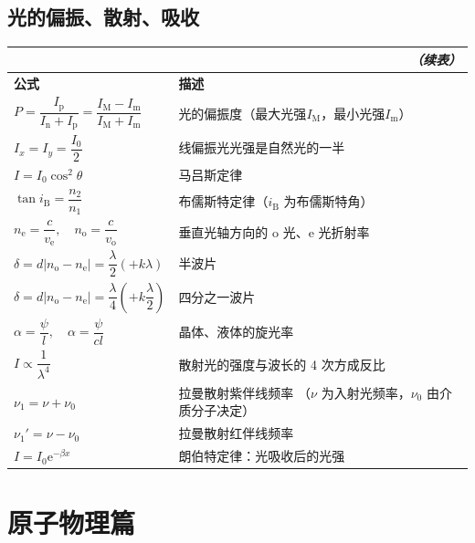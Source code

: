 \documentclass[UTF8]{ctexart}
\newcommand\Emph[1]{\colorbox{green!10}{\textcolor{green!30!black}{#1}}}
\newcommand\Example[1]{\textcolor{cyan!70!black}{\small #1}}
\begin{document}
\subsection{光的偏振、散射、吸收}
\begin{longtable}{|p{}|p{}|}
    \multicolumn{2}{r}{\textit{（续表）}} \\
    \hline
\endhead
    \hline
\endfirsthead
\endfoot
    \hline
\endlastfoot

    \textbf{公式} & \textbf{描述} \\
    \hline
    $P = \dfrac{I_{\mathrm{p}}}{I_{\mathrm{n}}+I_{\mathrm{p}}} = \dfrac{I_{\mathrm{M}}-I_{\mathrm{m}}}{I_{\mathrm{M}}+I_{\mathrm{m}}}$ & 光的偏振度\Example{（最大光强$I_{\mathrm{M}}$，最小光强$I_{\mathrm{m}}$）} \\
    \hline
    $I_x = I_y = \dfrac{I_0}{2}$ & 线偏振光光强是自然光的一半 \\
    \hline
    \Emph{$I = I_0\cos^2\theta$} & 马吕斯定律 \\
    \hline
    \Emph{$\tan i_{\mathrm{B}} = \dfrac{n_2}{n_1}$} & 布儒斯特定律\Example{（$i_{\mathrm{B}}$ 为布儒斯特角）} \\
    \hline
    $n_{\mathrm{e}} = \dfrac{c}{v_{\mathrm{e}}},\quad n_{\mathrm{o}} = \dfrac{c}{v_{\mathrm{o}}}$ & 垂直光轴方向的 o 光、e 光折射率 \\
    \hline
    $\delta = d|n_{\mathrm{o}} - n_{\mathrm{e}}| = \dfrac{\lambda}{2} (+k\lambda)$ & 半波片 \\
    \hline
    $\delta = d|n_{\mathrm{o}} - n_{\mathrm{e}}| = \dfrac{\lambda}{4} \left(+k\dfrac{\lambda}{2}\right)$ & 四分之一波片 \\
    \hline
    $\alpha = \dfrac{\psi}{l},\quad \alpha = \dfrac{\psi}{cl}$ & 晶体、液体的旋光率 \\
    \hline
    $I \varpropto \dfrac{1}{\lambda^4}$ & 散射光的强度与波长的 4 次方成反比 \\
    \hline
    $\nu_1 = \nu + \nu_0$ & 拉曼散射紫伴线频率 \Example{（$\nu$ 为入射光频率，$\nu_0$ 由介质分子决定）} \\
    \hline
    $\nu_1'= \nu - \nu_0$ & 拉曼散射红伴线频率 \\
    \hline
    $I = I_0\mathrm{e}^{-\beta x}$ & 朗伯特定律：光吸收后的光强 \\
    \hline
\end{longtable}

\section{原子物理篇}
\end{document}
